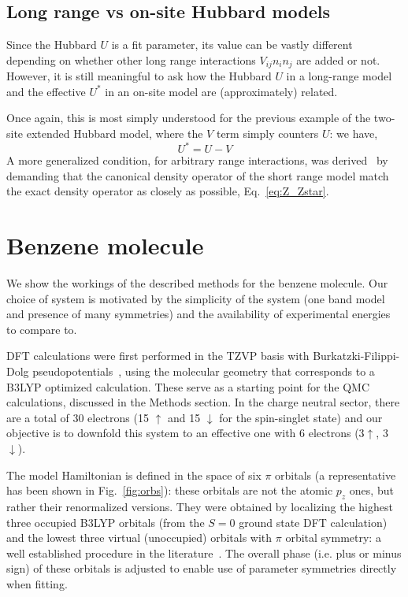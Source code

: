 \documentclass[aip,jcp,twocolumn,10pt]{revtex4-1}
\begin{document}
\subsection{Long range vs on-site Hubbard models}
Since the Hubbard $U$ is a fit parameter, its value 
can be vastly different depending on whether other long range 
interactions $V_{ij} n_i n_j$ are added or not. However, it is still 
meaningful to ask how the Hubbard $U$ in a long-range model 
and the effective $U^{*}$ in an on-site model are (approximately) 
related. 

Once again, this is most simply understood 
for the previous example of the two-site extended 
Hubbard model, where the $V$ term 
simply counters $U$: we have, 
\begin{equation}
	U^{*} = U - V
\end{equation}
A more generalized condition, for arbitrary range interactions, 
was derived~\cite{Schuler_graphene} by demanding that the canonical 
density operator of the short range model match the exact density operator 
as closely as possible, Eq.~\eqref{eq:Z_Zstar}. 

\section{Benzene molecule}
We show the workings of the described methods for the benzene molecule. 
Our choice of system is motivated by the simplicity of the system (one band model and presence of many symmetries) 
and the availability of experimental energies to compare to. 


DFT calculations were first performed in the TZVP basis with Burkatzki-Filippi-Dolg pseudopotentials~\cite{BFD}, 
using the molecular geometry that corresponds to a B3LYP optimized calculation. 
These serve as a starting point for the QMC calculations, discussed in the Methods section.
In the charge neutral sector, there are a total of 30 electrons (15 $\uparrow$  and 15 $\downarrow$ 
for the spin-singlet state) and our objective is to downfold 
this system to an effective one with 6 electrons (3$\uparrow$, 3 $\downarrow$). 

The model Hamiltonian is defined in the space of six $\pi$ orbitals (a representative has been shown in Fig.~\ref{fig:orbs}): 
these orbitals are not the atomic $p_z$ ones, but rather their renormalized versions.
They were obtained by localizing the highest three occupied B3LYP orbitals 
(from the $S=0$ ground state DFT calculation) and the lowest three virtual (unoccupied) orbitals with $\pi$ orbital symmetry: 
a well established procedure in the literature~\cite{Hansen}.  The overall phase (i.e. plus or minus sign) 
of these orbitals is adjusted to enable use of parameter symmetries directly when fitting.
\end{document}
